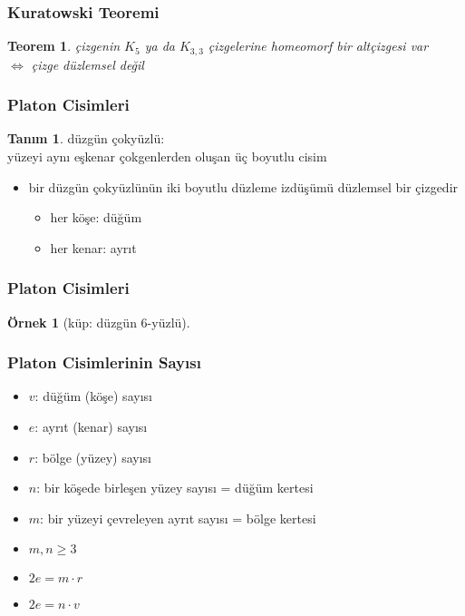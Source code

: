 \documentclass[dvipsnames]{beamer}
\theoremstyle{definition}
\newtheorem{tanim}[theorem]{Tanım}
\theoremstyle{example}
\newtheorem{ornek}[theorem]{Örnek}
\theoremstyle{plain}
\newtheorem{teorem}[theorem]{Teorem}
\begin{document}
\begin{frame}
  \frametitle{Kuratowski Teoremi}

  \begin{teorem}
    çizgenin $K_5$ ya da $K_{3,3}$ çizgelerine homeomorf bir altçizgesi var\\
    $\Leftrightarrow$ çizge düzlemsel değil
  \end{teorem}
\end{frame}

\begin{frame}
  \frametitle{Platon Cisimleri}

  \begin{tanim}
    \alert{düzgün çokyüzlü}:\\
    yüzeyi aynı eşkenar çokgenlerden oluşan üç boyutlu cisim
  \end{tanim}

  \pause
  \begin{itemize}
    \item bir düzgün çokyüzlünün iki boyutlu düzleme izdüşümü düzlemsel bir
      çizgedir
    \begin{itemize}
      \item her köşe: düğüm
      \item her kenar: ayrıt
    \end{itemize}
  \end{itemize}
\end{frame}

\begin{frame}
  \frametitle{Platon Cisimleri}

  \begin{ornek}[küp: düzgün 6-yüzlü]
    \begin{center}
    \end{center}
  \end{ornek}
\end{frame}

\begin{frame}
  \frametitle{Platon Cisimlerinin Sayısı}

  \begin{itemize}
    \item $v$: düğüm (köşe) sayısı
    \item $e$: ayrıt (kenar) sayısı
    \item $r$: bölge (yüzey) sayısı
    \item $n$: bir köşede birleşen yüzey sayısı = düğüm kertesi
    \item $m$: bir yüzeyi çevreleyen ayrıt sayısı = bölge kertesi
  \end{itemize}

  \pause
  \begin{itemize}
    \item $m,n \geq 3$
    \item $2e = m \cdot r$
    \item $2e = n \cdot v$
  \end{itemize}
\end{frame}
\end{document}
